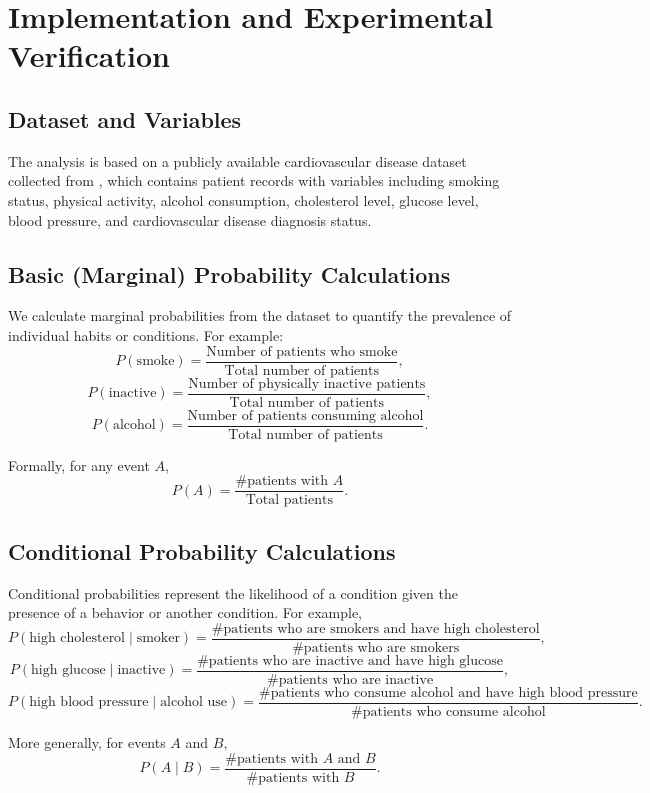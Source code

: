 \documentclass[11pt]{article}
\begin{document}
\section{Implementation and Experimental Verification}


\subsection{Dataset and Variables}
The analysis is based on a publicly available cardiovascular disease dataset collected from \cite{kaggleCardioDataset}, which contains patient records with variables including smoking status, physical activity, alcohol consumption, cholesterol level, glucose level, blood pressure, and cardiovascular disease diagnosis status.


\subsection{Basic (Marginal) Probability Calculations}
We calculate marginal probabilities from the dataset to quantify the prevalence of individual habits or conditions. For example:
\[
P(\text{smoke}) = \frac{\text{Number of patients who smoke}}{\text{Total number of patients}},
\]
\[
P(\text{inactive}) = \frac{\text{Number of physically inactive patients}}{\text{Total number of patients}},
\]
\[
P(\text{alcohol}) = \frac{\text{Number of patients consuming alcohol}}{\text{Total number of patients}}.
\]

Formally, for any event \(A\),
\[
P(A) = \frac{\# \text{patients with } A}{\text{Total patients}}.
\]

\subsection{Conditional Probability Calculations}
Conditional probabilities represent the likelihood of a condition given the presence of a behavior or another condition. For example,
\[
P(\text{high cholesterol} \mid \text{smoker}) = \frac{\# \text{patients who are smokers and have high cholesterol}}{\# \text{patients who are smokers}},
\]
\[
P(\text{high glucose} \mid \text{inactive}) = \frac{\# \text{patients who are inactive and have high glucose}}{\# \text{patients who are inactive}},
\]
\[
P(\text{high blood pressure} \mid \text{alcohol use}) = \frac{\# \text{patients who consume alcohol and have high blood pressure}}{\# \text{patients who consume alcohol}}.
\]

More generally, for events \(A\) and \(B\),
\[
P(A \mid B) = \frac{\# \text{patients with } A \text{ and } B}{\# \text{patients with } B}.
\]
\end{document}
